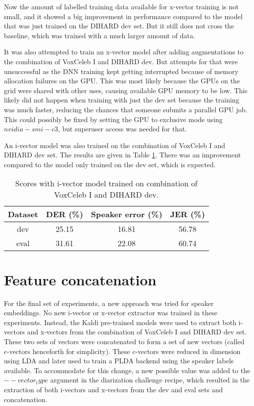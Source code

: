 		Now the amount of labelled training data available for x-vector training is not small, and it showed a big improvement in performance compared to the model that was just trained on the DIHARD dev set. But it still does not cross the baseline, which was trained with a much larger amount of data.
		
		It was also attempted to train an x-vector model after adding augmentations to the combination of VoxCeleb I and DIHARD dev. But attempts for that were unsuccessful as the DNN training kept getting interrupted because of memory allocation failures on the GPU. This was most likely because the GPUs on the grid were shared with other uses, causing available GPU memory to be low. This likely did not happen when training with just the dev set because the training was much faster, reducing the chances that someone submits a parallel GPU job. This could possibly be fixed by setting the GPU to exclusive mode using $nvidia-smi -c 3$, but superuser access was needed for that.
				
		An i-vector model was also trained on the combination of VoxCeleb I and DIHARD dev set. The results are given in Table \ref{table-voxdev-ivec}. There was an improvement compared to the model only trained on the dev set, which is expected.
		
		\begin{table}[h]
			\centering
			\begin{tabular}{|c|c|c|c|}
				\hline
				Dataset & DER (\%) & Speaker error (\%) & JER (\%) \\
				\hline
				dev & 25.15 & 16.81 & 56.78 \\
				\hline
				eval & 31.61 & 22.08 & 60.74 \\
				\hline
			\end{tabular}
			\caption{Scores with i-vector model trained on combination of VoxCeleb I and DIHARD dev.}
			\label{table-voxdev-ivec}
		\end{table}
		
	\section{Feature concatenation}
	For the final set of experiments, a new approach was tried for speaker embeddings. No new i-vector or x-vector extractor was trained in these experiments. Instead, the Kaldi pre-trained models were used to extract both i-vectors and x-vectors from the combination of VoxCeleb I and DIHARD dev set. These two sets of vectors were concatenated to form a set of new vectors (called c-vectors henceforth for simplicity). These c-vectors were reduced in dimension using LDA and later used to train a PLDA backend using the speaker labels available. To accommodate for this change, a new possible value was added to the $--vector_type$ argument in the diarization challenge recipe, which resulted in the extraction of both i-vectors and x-vectors from the dev and eval sets and concatenation.
	
